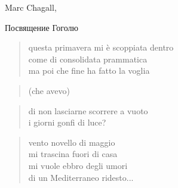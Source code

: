 \begin{artItem}
	Marc Chagall, \begin{otherlanguage}{russian}%
		Посвящение Гоголю%
	\end{otherlanguage}
\end{artItem}

	\begin{verse}
		questa primavera mi è scoppiata dentro\\
		come di consolidata prammatica\\
		ma poi che fine ha fatto la voglia
	\end{verse}

	\begin{verse}
		(che avevo)
	\end{verse}

	\begin{verse}
		di non lasciarne scorrere a vuoto\\
		i giorni gonfi di luce?
	\end{verse}

\clearpage


	\begin{verse}
		vento novello di maggio\\
		mi trascina fuori di casa\\
		mi vuole ebbro degli umori\\
		di un Mediterraneo ridesto...
	\end{verse}
